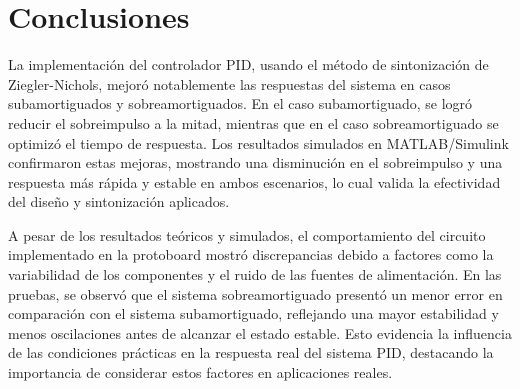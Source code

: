 \documentclass[conference]{IEEEtran}
\begin{document}
	\section{Conclusiones}
	La implementación del controlador PID, usando el método de sintonización de Ziegler-Nichols, mejoró notablemente las respuestas del sistema en casos subamortiguados y sobreamortiguados. En el caso subamortiguado, se logró reducir el sobreimpulso a la mitad, mientras que en el caso sobreamortiguado se optimizó el tiempo de respuesta. Los resultados simulados en MATLAB/Simulink confirmaron estas mejoras, mostrando una disminución en el sobreimpulso y una respuesta más rápida y estable en ambos escenarios, lo cual valida la efectividad del diseño y sintonización aplicados.
	
	A pesar de los resultados teóricos y simulados, el comportamiento del circuito implementado en la protoboard mostró discrepancias debido a factores como la variabilidad de los componentes y el ruido de las fuentes de alimentación. En las pruebas, se observó que el sistema sobreamortiguado presentó un menor error en comparación con el sistema subamortiguado, reflejando una mayor estabilidad y menos oscilaciones antes de alcanzar el estado estable. Esto evidencia la influencia de las condiciones prácticas en la respuesta real del sistema PID, destacando la importancia de considerar estos factores en aplicaciones reales.
	
	
	
	
	
\end{document}
